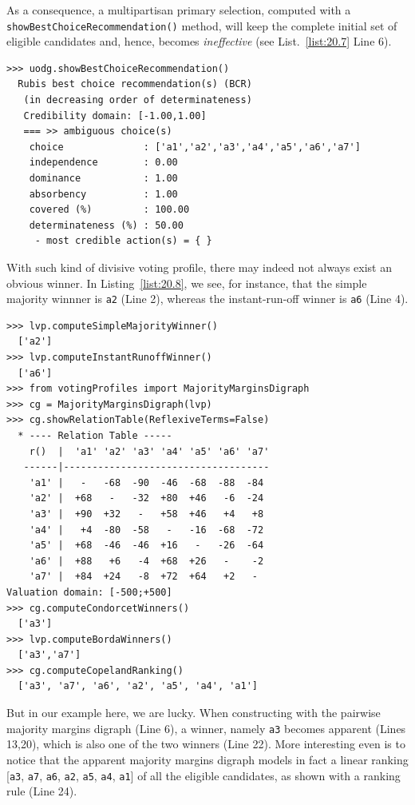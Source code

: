As a consequence, a multipartisan primary selection, computed with a \texttt{showBestChoiceRecommendation()} method,  will keep the complete initial set of eligible candidates and, hence, becomes \emph{ineffective} (see List.~\vref{list:20.7} Line 6).
\begin{lstlisting}[caption={Example of ineffective primary multipartisan selection},label=list:20.7]
>>> uodg.showBestChoiceRecommendation()
  Rubis best choice recommendation(s) (BCR)
   (in decreasing order of determinateness)   
   Credibility domain: [-1.00,1.00]
   === >> ambiguous choice(s)
    choice              : ['a1','a2','a3','a4','a5','a6','a7']
    independence        : 0.00
    dominance           : 1.00
    absorbency          : 1.00
    covered (%)         : 100.00
    determinateness (%) : 50.00
     - most credible action(s) = { }
\end{lstlisting}

With such kind of divisive voting profile, there may indeed not always exist an obvious winner. In Listing~\vref{list:20.8}, we see, for instance, that the simple majority winnner is \texttt{a2} (Line 2), whereas the instant-run-off winner is \texttt{a6} (Line 4).
\begin{lstlisting}[caption={Example of non obvious secondary selection},label=list:20.8]
>>> lvp.computeSimpleMajorityWinner()
  ['a2']
>>> lvp.computeInstantRunoffWinner()
  ['a6']
>>> from votingProfiles import MajorityMarginsDigraph
>>> cg = MajorityMarginsDigraph(lvp)
>>> cg.showRelationTable(ReflexiveTerms=False)
  * ---- Relation Table -----
    r()  |  'a1' 'a2' 'a3' 'a4' 'a5' 'a6' 'a7'	  
   ------|------------------------------------
    'a1' |   -   -68  -90  -46  -68  -88  -84	 
    'a2' |  +68   -   -32  +80  +46   -6  -24	 
    'a3' |  +90  +32   -   +58  +46   +4   +8	 
    'a4' |   +4  -80  -58   -   -16  -68  -72	 
    'a5' |  +68  -46  -46  +16	 -   -26  -64	 
    'a6' |  +88   +6   -4  +68	+26   -    -2	 
    'a7' |  +84  +24   -8  +72	+64   +2   - 	 
Valuation domain: [-500;+500]
>>> cg.computeCondorcetWinners()
  ['a3']
>>> lvp.computeBordaWinners()
  ['a3','a7']
>>> cg.computeCopelandRanking()
  ['a3', 'a7', 'a6', 'a2', 'a5', 'a4', 'a1']
\end{lstlisting}
But in our example here, we are lucky. When constructing with the pairwise majority margins digraph (Line 6), a \Condorcet winner, namely \texttt{a3} becomes apparent (Lines 13,20), which is also one of the two \Borda winners (Line 22). More interesting even is to notice that the apparent majority margins digraph models in fact a linear ranking [\texttt{a3}, \texttt{a7}, \texttt{a6}, \texttt{a2}, \texttt{a5}, \texttt{a4}, \texttt{a1}] of all the eligible candidates, as shown with a \Copeland ranking rule (Line 24).

